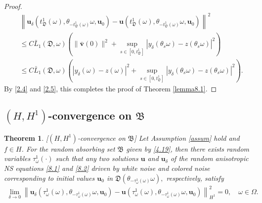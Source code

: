 \documentclass{elsarticle}
\newtheorem{theorem}{Theorem}[section]
\theoremstyle{definition}
\numberwithin{equation}{section}
\begin{document}
\begin{proof}
\begin{align*}
&\left \| \textbf{u}_\delta \! \left ( t_{\mathfrak D}^1 (\omega) ,\theta_{-t_{\mathfrak D}^1(\omega)}\omega,  \textbf{u}_{0}\right)
 - \textbf{u} \! \left ( t_{\mathfrak D}^1 (\omega) ,\theta_{-t_{\mathfrak D}^1(\omega)}\omega, \textbf{u}_{0}\right) \right \|^2\nonumber\\
 &\leq C\bar{L}_1({\mathfrak D}, \omega)\left (\|\bar{\textbf{v}}(0)\|^2+\sup\limits_{s\in[0,t_{\mathfrak D}^1]}|y_\delta(\theta_s\omega)-z(\theta_s\omega)|^2\right )\nonumber\\
 &\leq C\bar{L}_1({\mathfrak D}, \omega)\left (|y_\delta(\omega)-z(\omega)|^2+\sup\limits_{s\in[0,t_{\mathfrak D}^1]}|y_\delta(\theta_s\omega)-z(\theta_s\omega)|^2\right ).
\end{align*}
By \eqref{2.4} and \eqref{2.5}, this completes the proof of Theorem \ref{lemma8.1}.

\end{proof}
\subsection{$(H,H^1)$-convergence on $\mathfrak B$}
\begin{theorem}\label{lemma8.2}[$(H,H^1)$-convergence on $\mathfrak B$]
Let Assumption \ref{assum} hold and $f\in H$.
 For the random absorbing set $\mathfrak B$ given by \eqref{4.19}, then there exists random variables $\tau_\omega^1(\cdot) $ such that  any
 two solutions $\textbf{u}$ and $\textbf{u}_\delta$ of the random anisotropic  NS equations \eqref{8.1} and \eqref{8.2} driven by  white noise  and colored noise corresponding to initial values $\textbf{u}_{0}$  in $ \mathfrak D( \theta_{-\tau_\omega^1(\omega)}\omega),$   respectively,  satisfy
\begin{align*}
\lim\limits_{\delta\rightarrow0}\left \| \textbf{u}_\delta \! \left ( \tau_\omega^1 (\omega) ,\theta_{-\tau_\omega^1(\omega)}\omega,  \textbf{u}_{0}\right)
 - \textbf{u} \! \left ( \tau_\omega^1 (\omega) ,\theta_{-\tau_\omega^1(\omega)}\omega, \textbf{u}_{0}\right) \right \|^2_{H^1}  =0,\quad \omega \in \Omega.
\end{align*}
\end{theorem}
\end{document}
